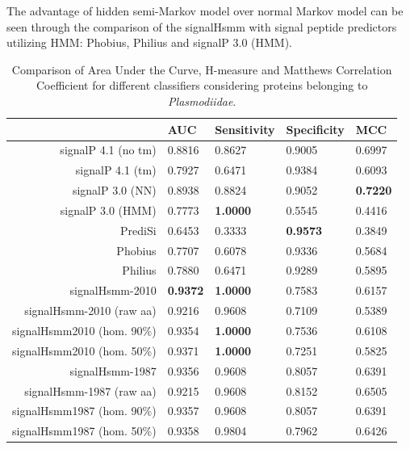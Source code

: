 \documentclass[10pt,letterpaper]{article}
\begin{document}
The advantage of hidden semi-Markov model over normal Markov model can be seen through the comparison of the signalHsmm with signal peptide predictors utilizing HMM: Phobius, Philius and signalP 3.0 (HMM).

\begin{table}[ht]
\centering
\caption{Comparison of Area Under the Curve, H-measure and Matthews Correlation Coefficient 
for different classifiers considering proteins belonging to \textit{Plasmodiidae}.} 
\label{tab:bench2010plas}
\begin{tabular}{rllll}
  \toprule
 & AUC & Sensitivity & Specificity & MCC \\ 
  \midrule
signalP 4.1 (no tm) \cite{2011petersensignalp} & 0.8816 & 0.8627 & 0.9005 & 0.6997 \\ 
   \rowcolor[gray]{0.85}signalP 4.1 (tm) \cite{2011petersensignalp} & 0.7927 & 0.6471 & 0.9384 & 0.6093 \\ 
  signalP 3.0 (NN) \cite{2004bendtsenimproved} & 0.8938 & 0.8824 & 0.9052 & \textbf{0.7220} \\ 
   \rowcolor[gray]{0.85}signalP 3.0 (HMM) \cite{2004bendtsenimproved} & 0.7773 & \textbf{1.0000} & 0.5545 & 0.4416 \\ 
  PrediSi \cite{2004hillerpredisi} & 0.6453 & 0.3333 & \textbf{0.9573} & 0.3849 \\ 
   \rowcolor[gray]{0.85}Phobius \cite{2004klla} & 0.7707 & 0.6078 & 0.9336 & 0.5684 \\ 
  Philius \cite{2008reynoldstransmembrane} & 0.7880 & 0.6471 & 0.9289 & 0.5895 \\ 
   \rowcolor[gray]{0.85}signalHsmm-2010 & \textbf{0.9372} & \textbf{1.0000} & 0.7583 & 0.6157 \\ 
  signalHsmm-2010 (raw aa) & 0.9216 & 0.9608 & 0.7109 & 0.5389 \\ 
   \rowcolor[gray]{0.85}signalHsmm2010 (hom. 90\%) & 0.9354 & \textbf{1.0000} & 0.7536 & 0.6108 \\ 
  signalHsmm2010 (hom. 50\%) & 0.9371 & \textbf{1.0000} & 0.7251 & 0.5825 \\ 
   \rowcolor[gray]{0.85}signalHsmm-1987 & 0.9356 & 0.9608 & 0.8057 & 0.6391 \\ 
  signalHsmm-1987 (raw aa) & 0.9215 & 0.9608 & 0.8152 & 0.6505 \\ 
   \rowcolor[gray]{0.85}signalHsmm1987 (hom. 90\%) & 0.9357 & 0.9608 & 0.8057 & 0.6391 \\ 
  signalHsmm1987 (hom. 50\%) & 0.9358 & 0.9804 & 0.7962 & 0.6426 \\ 
   \bottomrule
\end{tabular}
\end{table}
\end{document}
